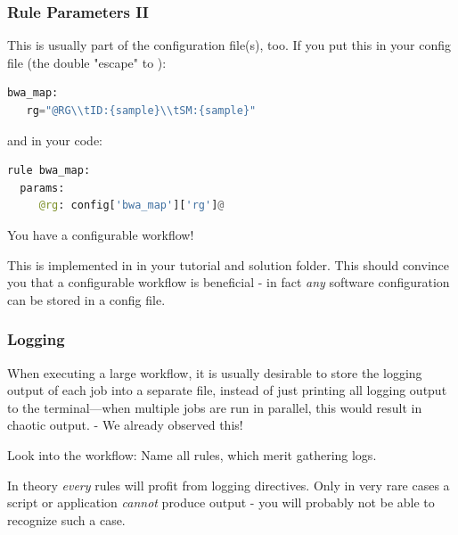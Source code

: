 \begin{frame}[fragile]
  \frametitle{Rule Parameters II}
  This is usually part of the configuration file(s), too.\newline
  If you put this in your config file (the double \altverb{\\} "escape" to \altverb{\t}):
  \begin{lstlisting}[language=Python,style=Python]
bwa_map:
   rg="@RG\\tID:{sample}\\tSM:{sample}"
  \end{lstlisting}
  and in your code:
  \begin{lstlisting}[language=Python,style=Python]
rule bwa_map:
  params:
     @rg: config['bwa_map']['rg']@
  \end{lstlisting}
  You have a configurable workflow! 
  \begin{hint}
  	This is implemented in  in your tutorial and solution folder. This should convince you that a configurable workflow is beneficial - in fact \emph{any} software configuration can be stored in a config file.
  \end{hint}
\end{frame}

\begin{frame}
  \frametitle{Logging}
  \begin{hint}
  	When executing a large workflow, it is usually desirable to store the logging output of each job into a separate file, instead of just printing all logging output to the terminal—when multiple jobs are run in parallel, this would result in chaotic output. - We already observed this!
  \end{hint}
  \pause
  \begin{task}
  	Look into the workflow: Name all rules, which merit gathering logs.
  \end{task}
  \pause
  \begin{docs}
  	In theory \emph{every} rules will profit from logging directives. Only in very rare cases a script or application \emph{cannot} produce output - you will probably not be able to recognize such a case.
  \end{docs}
\end{frame}


